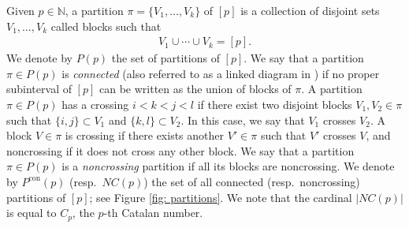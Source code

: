 \documentclass[12pt,reqno]{amsart}
\theoremstyle{plain}
\newcommand{\1}{\mathbf{1}}
\newcommand{\N}{\mathbb{N}}
\begin{document}



Given $p\in \N$, a partition $\pi=\{V_1, \ldots ,V_k\}$ of $[p]$ is a collection of disjoint sets $V_1,\ldots,V_k$ called blocks such that 
\begin{align*}
    V_1 \cup \cdots \cup V_k=[p].
\end{align*}
We denote by $P(p)$ the set of partitions of $[p]$. We say that a partition $\pi \in P(p)$ is \textit{connected} (also referred to as a linked diagram in \cite{NH1979}) if no proper subinterval of $[p]$ can be written as the union of blocks of $\pi$. A partition $\pi \in P(p)$ has a crossing $i<k<j<l$ if there exist two disjoint blocks $V_1,V_2 \in \pi$ such that $\{i,j\}\subset V_1$ and $\{k,l\} \subset V_2$. In this case, we say that $V_1$ crosses $V_2$.
A block $V\in \pi$ is crossing if there exists another $V' \in \pi$ such that $V'$ crosses $V$, and noncrossing if it does not cross any other block. 
We say that a partition $\pi \in P(p)$ is a \textit{noncrossing} partition if all its blocks are noncrossing. 
We denote by $P^{\operatorname{con}}(p)$ (resp.~$NC(p)$) the set of all connected (resp.~noncrossing) partitions of $[p]$; see Figure \ref{fig: partitions}. We note that the cardinal $|NC(p)|$ is equal to $C_p$, the $p$-th Catalan number.
\end{document}
